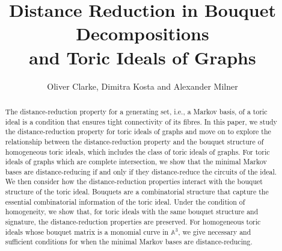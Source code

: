 \documentclass[a4paper, 12pt]{article}
\title{
Distance Reduction in Bouquet Decompositions\\
and Toric Ideals of Graphs}
\author{Oliver Clarke, Dimitra Kosta and Alexander Milner}
\date{}
\theoremstyle{plain}
\theoremstyle{definition}
\theoremstyle{remark}
\begin{document}
\maketitle

\begin{abstract}
    The distance-reduction property for a generating set, i.e., a Markov basis, of a toric ideal is a condition that ensures tight connectivity of its fibres. In this paper, we study the distance-reduction property for toric ideals of graphs and move on to explore the relationship between the distance-reduction property and the bouquet structure of homogeneous toric ideals, which includes the class of toric ideals of graphs. For toric ideals of graphs which are complete intersection, we show that the minimal Markov bases are distance-reducing if and only if they distance-reduce the circuits of the ideal. We then consider how the distance-reduction properties interact with the bouquet structure of the toric ideal. Bouquets are a combinatorial  structure that capture the essential combinatorial information of the toric ideal.  Under the condition of homogeneity, we show that, for toric ideals with the same bouquet structure and signature, the distance-reduction properties are preserved. For homogeneous toric ideals whose bouquet matrix is a monomial curve in $\mathbb{A}^3$, we give necessary and sufficient conditions for when the minimal Markov bases are distance-reducing.

\end{abstract}

\tableofcontents





\end{document}
